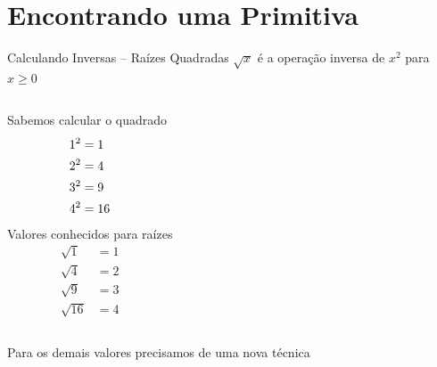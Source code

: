 \documentclass[fleqn,utf8,aspectratio=169,12pt]{beamer}
\begin{document}
\section{Encontrando uma Primitiva}

\begin{frame}{Calculando Inversas -- Raízes Quadradas}
\(\sqrt{x}\) é a operação inversa de \(x^2\) para \(x\geq0\)

\pause
\bigskip
\begin{columns}
  Sabemos calcular o quadrado
  \begin{align*}
    \vphantom{\sqrt{9}} 1^2 & = 1 \\
    \vphantom{\sqrt{9}} 2^2 & = 4 \\
    \vphantom{\sqrt{9}} 3^2 & = 9 \\
    \vphantom{\sqrt{9}} 4^2 & = 16
  \end{align*}
  \pause
  Valores conhecidos para raízes
  \begin{align*}
    \sqrt{1}  & = 1 \\
    \sqrt{4}  & = 2 \\
    \sqrt{9}  & = 3 \\
    \sqrt{16} & = 4
  \end{align*}
\end{columns}

\pause
\bigskip
Para os demais valores precisamos de uma nova técnica
\end{frame}


\end{document}
